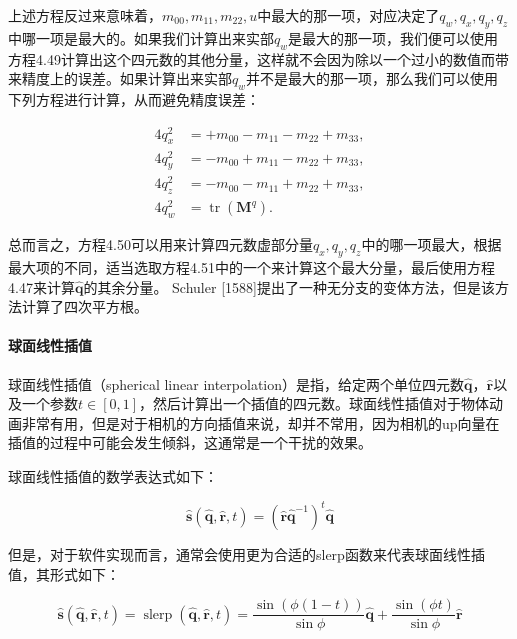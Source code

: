 \documentclass[
  paper=a4,
  ,captions=tableheading
]{scrartcl}
\begin{document}
上述方程反过来意味着，\(m_{00}, m_{11}, m_{22},u\)中最大的那一项，对应决定了\(q_{w},q_{x},q_{y},q_{z}\)中哪一项是最大的。如果我们计算出来实部\(q_w\)是最大的那一项，我们便可以使用方程4.49计算出这个四元数的其他分量，这样就不会因为除以一个过小的数值而带来精度上的误差。如果计算出来实部\(q_w\)并不是最大的那一项，那么我们可以使用下列方程进行计算，从而避免精度误差：

\[
  \begin{aligned}
    4 q_{x}^{2} & =+m_{00}-m_{11}-m_{22}+m_{33},                 \\
    4 q_{y}^{2} & =-m_{00}+m_{11}-m_{22}+m_{33},                 \\
    4 q_{z}^{2} & =-m_{00}-m_{11}+m_{22}+m_{33},                 \\
    4 q_{w}^{2} & =\operatorname{tr}\left(\mathbf{M}^{q}\right).
  \end{aligned}
  \tag{4.51}
\]

总而言之，方程4.50可以用来计算四元数虚部分量\(q_{x},q_{y},q_{z}\)中的哪一项最大，根据最大项的不同，适当选取方程4.51中的一个来计算这个最大分量，最后使用方程4.47来计算\(\mathbf{\hat{q}}\)的其余分量。
Schuler
{[}1588{]}提出了一种无分支的变体方法，但是该方法计算了四次平方根。

\paragraph{球面线性插值}\label{ux7403ux9762ux7ebfux6027ux63d2ux503c}

球面线性插值（spherical linear
interpolation）是指，给定两个单位四元数\(\mathbf{\hat{q}}\)，\(\mathbf{\hat{r}}\)以及一个参数\(t \in [0,1]\)，然后计算出一个插值的四元数。球面线性插值对于物体动画非常有用，但是对于相机的方向插值来说，却并不常用，因为相机的up向量在插值的过程中可能会发生倾斜，这通常是一个干扰的效果。

球面线性插值的数学表达式如下：

\[
  \hat{\mathbf{s}}(\hat{\mathbf{q}}, \hat{\mathbf{r}}, t)=\left(\hat{\mathbf{r}} \hat{\mathbf{q}}^{-1}\right)^{t} \hat{\mathbf{q}}
  \tag{4.52}
\]

但是，对于软件实现而言，通常会使用更为合适的slerp函数来代表球面线性插值，其形式如下：

\[
  \hat{\mathbf{s}}(\hat{\mathbf{q}}, \hat{\mathbf{r}}, t)
  =\operatorname{slerp}(\hat{\mathbf{q}}, \hat{\mathbf{r}}, t)
  =\frac{\sin (\phi(1-t))}{\sin \phi} \hat{\mathbf{q}}
  +\frac{\sin (\phi t)}{\sin \phi} \hat{\mathbf{r}}
  \tag{4.53}
\]
\end{document}
